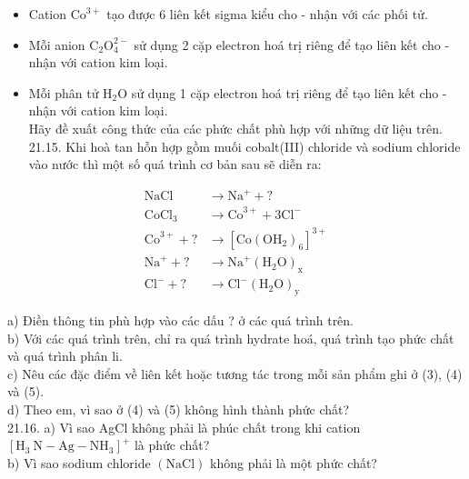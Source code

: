 \documentclass[10pt]{article}
\begin{document}
\begin{itemize}
  \item Cation $\mathrm{Co}^{3+}$ tạo được 6 liên kết sigma kiểu cho - nhận với các phối tử.
  \item Mỗi anion $\mathrm{C}_{2} \mathrm{O}_{4}^{2-}$ sử dụng 2 cặp electron hoá trị riêng để tạo liên kết cho - nhận với cation kim loại.
  \item Mỗi phân tử $\mathrm{H}_{2} \mathrm{O}$ sử dụng 1 cặp electron hoá trị riêng để tạo liên kết cho - nhận với cation kim loại.\\
Hãy đề xuất công thức của các phức chất phù hợp với những dữ liệu trên.\\
21.15. Khi hoà tan hỗn hợp gồm muối cobalt(III) chloride và sodium chloride vào nước thì một số quá trình cơ bản sau sẽ diễn ra:
\end{itemize}

\[
\begin{array}{ll}
\mathrm{NaCl} & \rightarrow \mathrm{Na}^{+}+? \\
\mathrm{CoCl}_{3} & \rightarrow \mathrm{Co}^{3+}+3 \mathrm{Cl}^{-} \\
\mathrm{Co}^{3+}+? & \rightarrow\left[\mathrm{Co}\left(\mathrm{OH}_{2}\right)_{6}\right]^{3+} \\
\mathrm{Na}^{+}+? & \rightarrow \mathrm{Na}^{+}\left(\mathrm{H}_{2} \mathrm{O}\right)_{\mathrm{x}} \\
\mathrm{Cl}^{-}+? & \rightarrow \mathrm{Cl}^{-}\left(\mathrm{H}_{2} \mathrm{O}\right)_{\mathrm{y}} \tag{5}
\end{array}
\]

a) Điền thông tin phù hợp vào các dấu ? ở các quá trình trên.\\
b) Với các quá trình trên, chỉ ra quá trình hydrate hoá, quá trình tạo phức chất và quá trình phân li.\\
c) Nêu các đặc điểm về liên kết hoặc tương tác trong mỗi sản phẩm ghi ở (3), (4) và (5).\\
d) Theo em, vì sao ở (4) và (5) không hình thành phức chất?\\
21.16. a) Vì sao AgCl không phải là phúc chất trong khi cation $\left[\mathrm{H}_{3} \mathrm{~N}-\mathrm{Ag}-\mathrm{NH}_{3}\right]^{+}$ là phức chất?\\
b) Vì sao sodium chloride $(\mathrm{NaCl})$ không phải là một phức chất?
\end{document}
